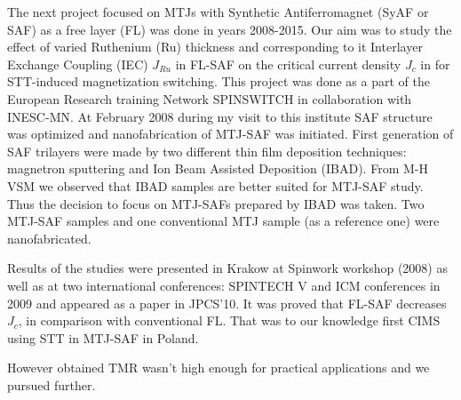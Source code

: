 The next project focused on MTJs with Synthetic Antiferromagnet (SyAF or SAF) as a free layer (FL) was done in years 2008-2015. Our aim was to study the effect of varied Ruthenium (Ru) thickness and corresponding to it Interlayer Exchange Coupling (IEC) $J_{Ru}$ in FL-SAF on the critical current density $J_c$ in for STT-induced magnetization switching.
This project was done as a part of the European Research training Network SPINSWITCH in collaboration with INESC-MN. At February 2008 during my visit to this institute SAF structure was optimized and nanofabrication of MTJ-SAF was initiated. 
First generation of SAF trilayers were made by two different thin film deposition techniques: magnetron sputtering and Ion Beam Assisted Deposition (IBAD). From M-H VSM we observed that IBAD samples are better suited for MTJ-SAF study. Thus the decision to focus on MTJ-SAFs prepared by IBAD was taken. Two MTJ-SAF samples and one conventional MTJ sample (as a reference one) were nanofabricated. 

Results of the studies were presented in Krakow at Spinwork workshop (2008) as well as at two international conferences: SPINTECH V and ICM conferences in 2009 and appeared as a paper in JPCS'10.
It was proved that FL-SAF decreases $J_c$, in comparison with conventional FL. That was to our knowledge first CIMS using STT in MTJ-SAF in Poland.

However obtained TMR wasn't high enough for practical applications and we pursued further.

